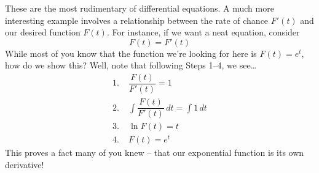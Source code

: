 These are the most rudimentary of differential equations. A much more interesting example involves a relationship between the rate of chance $F'(t)$ and our desired function $F(t)$. For instance, if we want a neat equation, consider
	\[
	F(t)=F'(t)
	\]
While most of you know that the function we're looking for here is $F(t)=e^t$, how do we show this? Well, note that following Steps 1--4, we see\dots
	\[
	\begin{split}
	1.&\; \dfrac{F(t)}{F'(t)}=1 \\
	2.&\; \int \dfrac{F(t)}{F'(t)} \, dt= \int 1 \, dt \\
	3.&\; \ln F(t)=t \\
	4.&\; F(t)=e^t
	\end{split}
	\]
This proves a fact many of you knew -- that our exponential function is its own derivative!













































